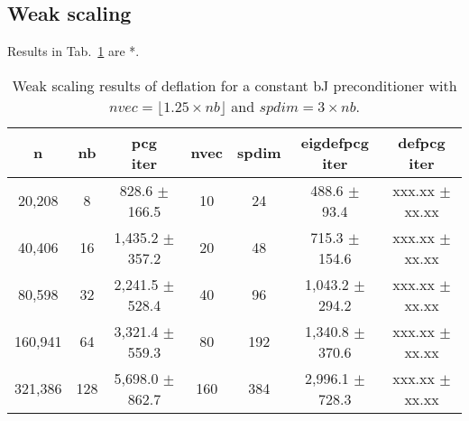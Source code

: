\documentclass{article}
\begin{document}
\subsection{Weak scaling}
Results in Tab.~\ref{Tab:005} are *.





\begin{table}[ht]
	\caption{Weak scaling results of deflation for a constant bJ preconditioner with $nvec=\lfloor1.25\times nb\rfloor$ and $spdim=3\times nb$.}
	\centering
	\begin{tabular}{|c|c|c|c|c|c|c|}
		\hline
		n & nb & \makecell{pcg\\ iter} & nvec & spdim & \makecell{eigdefpcg\\ iter} & \makecell{defpcg\\ iter}\\
		\hline
		20,208  &   8 &   828.6 $\pm$ 166.5 &  10 &  24 &   488.6 $\pm$  93.4 & xxx.xx $\pm$ xx.xx \\
		40,406  &  16 & 1,435.2 $\pm$ 357.2 &  20 &  48 &   715.3 $\pm$ 154.6 & xxx.xx $\pm$ xx.xx \\
		80,598  &  32 & 2,241.5 $\pm$ 528.4 &  40 &  96 & 1,043.2 $\pm$ 294.2 & xxx.xx $\pm$ xx.xx \\
		160,941 &  64 & 3,321.4 $\pm$ 559.3 &  80 & 192 & 1,340.8 $\pm$ 370.6 & xxx.xx $\pm$ xx.xx \\
		321,386 & 128 & 5,698.0 $\pm$ 862.7 & 160 & 384 & 2,996.1 $\pm$ 728.3 & xxx.xx $\pm$ xx.xx \\
		\hline
	\end{tabular}
	\label{Tab:005}
\end{table}
\end{document}
